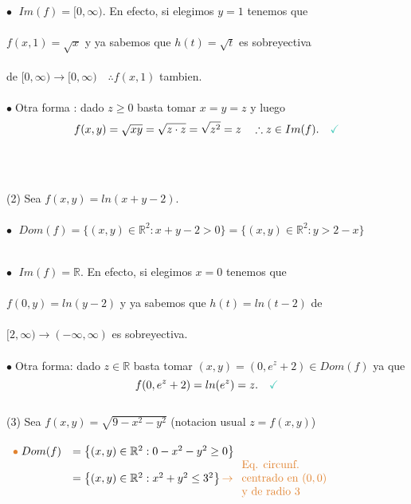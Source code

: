 \documentclass{article}
\theoremstyle{definition}
\theoremstyle{remark}
\newcommand\bl{$\bullet\;$}
\newcommand\ok{\checkmark}
\begin{document}
\textcolor{rojop2}{\bl} $Im(f)=[0,\infty)$. En efecto, si elegimos $y=1$ tenemos que \\\\ \phantom{\textcolor{rojop2}{\bl} $Im(f)=[$}$f(x,1) = \sqrt{x}$ y ya sabemos que $h(t) = \sqrt{t}$ es sobreyectiva \\\\ \phantom{\textcolor{rojop2}{\bl} $Im(f)=[$}de $[0,\infty) \to [0,\infty) \quad \therefore f(x,1)$ tambien. \\\\
\bl Otra forma : dado $z \geq 0 $ basta tomar $x=y=z$ y luego \[ 
  f(x,y)=\sqrt{xy} = \sqrt{z \cdot z} = \sqrt{z^2} = z \quad \therefore z \in Im(f). \quad \textcolor{verdep2}{\ok}
\]
\\\\ \pagebreak \\
\textcolor{verdep2}{(2)} Sea $f(x,y)=ln(x+y-2).$\\\\
\textcolor{rojop2}{\bl} \;  $Dom(f)=\big\{(x,y) \in \mathbb{R}^2 : x+y-2>0\big\} = \big\{(x,y) \in \mathbb{R}^2 : y > 2 - x \big\}$ \\
\begin{figure}[h]
\centering
\def\svgwidth{0.45\textwidth}

\end{figure}
\\
\textcolor{rojop2}{\bl} $Im(f)=\mathbb{R}$. \quad En efecto, si elegimos $x=0$ tenemos que \\\\
\phantom{\textcolor{rojop2}{\bl} $Im(f)$} $f(0,y)=ln(y-2)$ y ya sabemos que $h(t)=ln(t-2)$ de \\\\
\phantom{\textcolor{rojop2}{\bl} $Im(f)$} $[2,\infty) \to (-\infty,\infty)$ es sobreyectiva. \\\\
\bl Otra forma: dado $z \in \mathbb{R}$ basta tomar $(x,y)=(0,e^z+2) \in Dom(f)$ ya que \[
  f(0,e^z+2)=ln(e^z)=z. \quad \textcolor{verdep2}{\ok}
\] \pagebreak \\
\textcolor{verdep2}{(3)} Sea $f(x,y)=\sqrt{9-x^2-y^2}$ \quad \quad \big(notacion usual $z=f(x,y)$\big)\\\\
 \; $\begin{array}{ll}
 \textcolor{rojop2}{\bullet}\; Dom(f) &=\left\{(x,y)\in\mathbb{R}^2 : 0-x^2-y^2 \geq 0 \right\}\\ & =\left\{(x,y) \in \mathbb{R}^2 : x^2+y^2 \leq 3^2\right\} \textcolor{rojop2}{\to \begin{array}{l} \text{Eq. circunf.} \\
    \text{centrado en } (0,0) \\
\text{y de radio } 3\end{array}}\end{array}$
\end{document}
